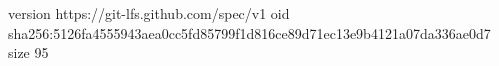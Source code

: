 version https://git-lfs.github.com/spec/v1
oid sha256:5126fa4555943aea0cc5fd85799f1d816ce89d71ec13e9b4121a07da336ae0d7
size 95
